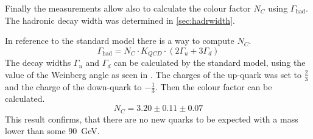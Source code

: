 \documentclass[epj,nopacs]{svjour}
\begin{document}
Finally the measurements allow also to calculate the colour factor $N_C$ using
$Γ_{\mathrm{had}}$. The hadronic decay width was determined in \ref{sec:hadrwidth}.

In reference to the standard model there is a way to compute $N_C$.
\begin{equation}
 Γ_{\mathrm{had}} = N_C \cdot K_{QCD}\cdot ( 2Γ_u + 3Γ_d )
 \label{eqn:gammahad2}
\end{equation}
The decay widths $Γ_u$ and $Γ_d$ can be calculated by the standard model, using the
value of the Weinberg angle as seen in . The charges of the up-quark was
set to $\frac{2}{3}$ and the charge of the down-quark to $-\frac{1}{3}$. Then the colour
factor can be calculated.
\begin{equation}
 N_C = 3.20 \pm 0.11 \pm 0.07
\end{equation}
This result confirms, that there are no new quarks to be expected with a mass
lower than some \SI{90}{\GeV}.


\end{document}
